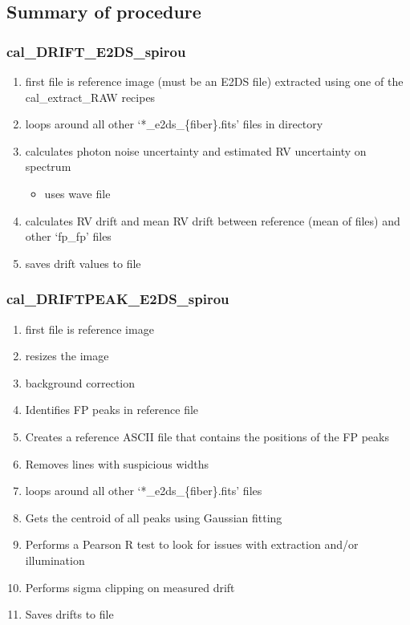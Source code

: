 \subsection{Summary of procedure}

\subsubsection{cal\_DRIFT\_E2DS\_spirou}

\begin{enumerate}
	\item first file is reference image (must be an E2DS file) extracted using one of the cal\_extract\_RAW recipes
	\item loops around all other `*\_e2ds\_\{fiber\}.fits' files in directory
	\item calculates photon noise uncertainty and estimated RV uncertainty on spectrum
	\begin{itemize}
		\item uses wave file
	\end{itemize}
	\item calculates RV drift and mean RV drift between reference (mean of files) and other `fp\_fp' files
	\item saves drift values to file
\end{enumerate}

\subsubsection{cal\_DRIFTPEAK\_E2DS\_spirou}

\begin{enumerate}
	\item first file is reference image
	\item resizes the image
	\item background correction
	\item Identifies FP peaks in reference file
	\item Creates a reference ASCII file that contains the positions of the FP peaks
	\item Removes lines with suspicious widths
	\item loops around all other `*\_e2ds\_\{fiber\}.fits' files
	\item Gets the centroid of all peaks using Gaussian fitting
	\item Performs a Pearson R test to look for issues with extraction and/or illumination
	\item Performs sigma clipping on measured drift
	\item Saves drifts to file
\end{enumerate}


